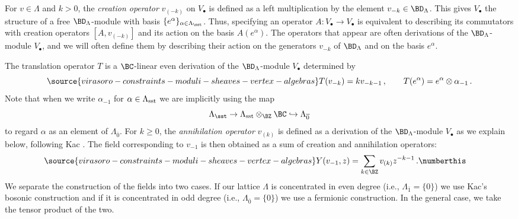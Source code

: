 For $v\in \Lambda$ and $k>0$, the \textit{creation operator} $v_{(-k)}$ on $V_\bullet$ is defined as a left multiplication by the element $v_{-k}\in \BD_\Lambda$. This gives $V_\bullet$ the structure of a free $\BD_\Lambda$-module with basis $\{e^\alpha\}_{\alpha\in \Lambda_\sst}$. Thus, specifying an operator $A\colon V_\bullet\to V_\bullet$ is equivalent to describing its commutators with creation operators $[A, v_{(-k)}]$ and its action on the basis $A(e^\alpha)$. The operators that appear are often derivations of the $\BD_\Lambda$-module $V_\bullet$, and we will often define them by describing their action on the generators $v_{-k}$ of $\BD_\Lambda$ and on the basis $e^\alpha$.

The translation operator $T$ is a $\BC$-linear even derivation of the $\BD_\Lambda$-module $V_{\bullet}$ determined by
\begin{equation}
\label{Eq: translation}
\source{virasoro-constraints-moduli-sheaves-vertex-algebras}
T(v_{-k}) = kv_{-k-1}\,,\qquad T(e^{\alpha}) = e^\alpha\otimes \alpha_{-1}\,.
\end{equation}
Note that when we write $\alpha_{-1}$ for $\alpha\in \Lambda_{\textup{sst}}$ we are implicitly using the map
\[\Lambda_{\textup{\sst}}\to \Lambda_{\textup{sst}}\otimes_\BZ\BC\hookrightarrow \Lambda_{\overline 0}\] to regard $\alpha$ as an element of $\Lambda_{\overline 0}$.
For $k\geq 0$, the \textit{annihilation operator} $v_{(k)}$ is defined as a derivation of the $\BD_{\Lambda}$-module $V_\bullet$ as we explain below, following Kac \cite[Sections 3.6 and 5.4]{Ka98}. The field corresponding to $v_{-1}$ is then obtained as a sum of creation and annihilation operators:
\begin{align*}
    \label{Eq: field}
\source{virasoro-constraints-moduli-sheaves-vertex-algebras}
    Y(v_{-1},z) &= \sum_{k\in \BZ}v_{(k)}z^{-k-1}\,.
    \numberthis
\end{align*}
We separate the construction of the fields into two cases. If our lattice $\Lambda$ is concentrated in even degree (i.e., $\Lambda_{\overline 1}=\{0\}$) we use Kac's bosonic construction and if it is concentrated in odd degree (i.e., $\Lambda_{\overline 0}=\{0\}$) we use a fermionic construction. In the general case, we take the tensor product of the two.
